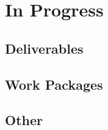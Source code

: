 \chapter{In Progress}
\label{chapter:in_progress}

\section{Deliverables}

\section{Work Packages}

\section{Other}
